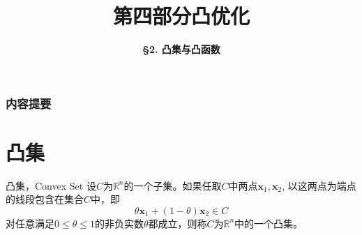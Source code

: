 



\title[Convex Optimization]{\LARGE \bfseries 第四部分\quad 凸优化} %
\author[Convex Sets and Convex Functions] %
{\Large \bfseries \S 2. 凸集与凸函数}
\date{}






\begin{frame}

\titlepage %

\end{frame}


\begin{frame}
\frametitle{内容提要} %
\tableofcontents %
\end{frame}


\section{凸集}


\begin{frame}

\begin{block}{凸集，Convex Set}
设$C$为$\mathbb{R}^n$的一个子集。如果任取$C$中两点$\mathbf{x}_1, \mathbf{x}_2$, 以这两点为端点的线段包含在集合$C$中，即
$$\theta \mathbf{x}_1 + (1-\theta)\mathbf{x}_2 \in C$$
对任意满足$0\le \theta \le 1$的非负实数$\theta$都成立，则称$C$为$\mathbb{R}^n$中的一个凸集。
\end{block}

\end{frame}

